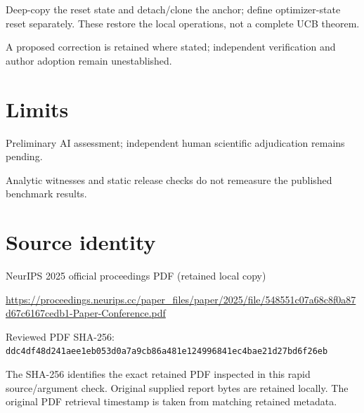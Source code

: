 \documentclass[11pt]{article}
\begin{document}
Deep-copy the reset state and detach/clone the anchor; define optimizer-state reset separately. These restore the local operations, not a complete UCB theorem.

A proposed correction is retained where stated; independent verification and author adoption remain unestablished.

\section*{Limits}

Preliminary AI assessment; independent human scientific adjudication remains pending.\par

Analytic witnesses and static release checks do not remeasure the published benchmark results.\par

\section*{Source identity}

NeurIPS 2025 official proceedings PDF (retained local copy)

\url{https://proceedings.neurips.cc/paper_files/paper/2025/file/548551c07a68c8f0a87d67c6167cedb1-Paper-Conference.pdf}

Reviewed PDF SHA-256: \nolinkurl{ddc4df48d241aee1eb053d0a7a9cb86a481e124996841ec4bae21d27bd6f26eb}

The SHA-256 identifies the exact retained PDF inspected in this rapid source/argument check. Original supplied report bytes are retained locally. The original PDF retrieval timestamp is taken from matching retained metadata.
\end{document}
